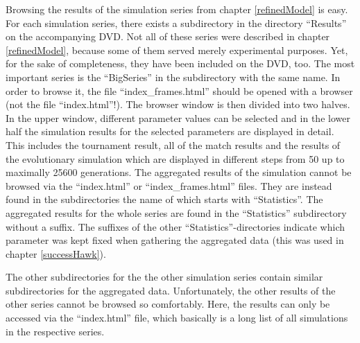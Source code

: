 Browsing the results of the simulation series from chapter \ref{refinedModel}
is easy. For each simulation series, there exists a subdirectory in the
directory ``Results'' on the accompanying DVD. Not all of these series were
described in chapter \ref{refinedModel}, because some of them served merely
experimental purposes. Yet, for the sake of completeness, they have been
included on the DVD, too. The most important series is the ``BigSeries'' in
the subdirectory with the same name. In order to browse it, the file
``index\_frames.html'' should be opened with a browser (not the file
``index.html''!). The browser window is then divided into two halves. In the
upper window, different parameter values can be selected and in the lower half
the simulation results for the selected parameters are displayed in detail.
This includes the tournament result, all of the match results and the results
of the evolutionary simulation which are displayed in different steps from 50
up to maximally 25600 generations. The aggregated results of the simulation
cannot be browsed via the ``index.html'' or ``index\_frames.html'' files.
They are instead found in the subdirectories the name of which starts with
``Statistics''. The aggregated results for the whole series are found in the
``Statistics'' subdirectory without a suffix. The suffixes of the other
``Statistics''-directories indicate which parameter was kept fixed when
gathering the aggregated data (this was used in chapter \ref{successHawk}).

The other subdirectories for the the other simulation series contain similar
subdirectories for the aggregated data. Unfortunately, the other results of the
other series cannot be browsed so comfortably. Here, the results can only be
accessed via the ``index.html'' file, which basically is a long list of all
simulations in the respective series.

\newpage
